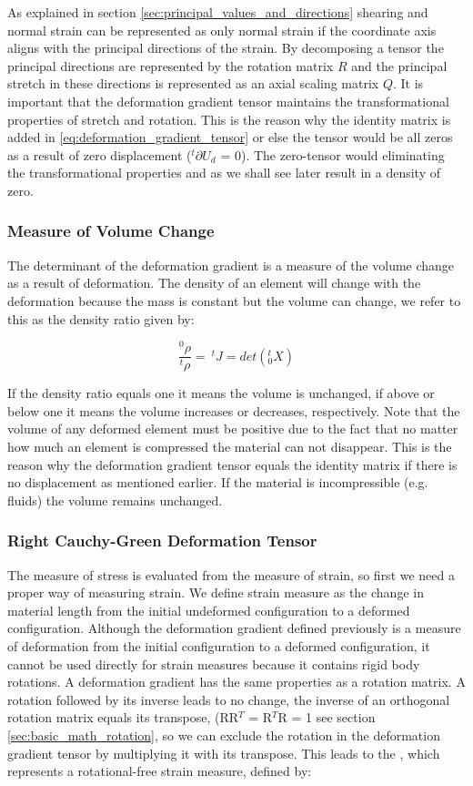 As explained in section \vref{sec:principal_values_and_directions}
shearing and normal
strain can be represented as only normal strain if the
coordinate axis aligns with the principal directions of the strain. By
decomposing a tensor the principal directions are
represented by the rotation matrix $R$ and the principal stretch in
these directions is represented as an axial scaling matrix $Q$. 
%
It is important that the deformation gradient
tensor maintains the transformational properties of stretch
and rotation. This is the reason why the identity matrix is added in
\eqref{eq:deformation_gradient_tensor} or else the tensor would
be all zeros as a result of zero displacement ($^t\partial U_d$ =
0). The zero-tensor would eliminating the transformational properties
and as we shall see later result in a density of zero.

\subsubsection*{Measure of Volume Change}
The determinant of the deformation gradient is a measure of the volume
change as a result of deformation. The density of an element will
change with the deformation because the mass is constant but the
volume can change, we refer to this as the density ratio given
by: 

\begin{equation}
\frac{^0\rho}{^t\rho} = \ ^tJ = det(^t_0X)
\end{equation}

If the density ratio equals one it means
the volume is unchanged, if above or below one it means the volume increases or
decreases, respectively. Note that the volume of any deformed element
must be positive due to the fact that no matter how much an element is
compressed the material can not disappear. This is the reason why the
deformation gradient tensor equals the identity matrix if there is no
displacement as mentioned earlier. If the
material is incompressible (e.g. fluids) the volume remains unchanged.

\subsubsection*{Right Cauchy-Green Deformation Tensor}
The measure of stress is evaluated from the measure of strain, so
first we need a proper way of measuring strain. We define strain
measure as the change in material length from the initial undeformed
configuration to a deformed configuration. Although the deformation gradient defined
previously is a measure of deformation from the initial configuration
to a deformed configuration, it cannot be used directly for
strain measures because it contains rigid body rotations. A
deformation gradient has the same properties as a rotation matrix. 
A rotation followed by its inverse leads to no change, the inverse of
an orthogonal rotation matrix equals its transpose, 
(RR$^{T}$ = R$^{T}$R = 1 see section \vref{sec:basic_math_rotation},
so we can exclude the rotation in the 
deformation gradient tensor by multiplying it with its transpose.  
This leads to the , which
represents a rotational-free strain measure, defined by:

